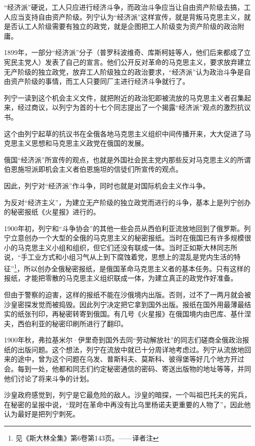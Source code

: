 “经济派”硬说，工人只应进行经济斗争，而政治斗争应当让自由资产阶级去搞，工人应当支持自由资产阶级。列宁认为“经济派”这样宣传，就是背叛马克思主义，就是否认工人阶级需要有独立的政党，就是企图把工人阶级变为资产阶级的政治附庸。

1899年，一部分“经济派”分子（普罗科波维奇、库斯柯娃等人，他们后来都成了立宪民主党人）发表了自己的宣言。他们公开反对革命的马克思主义，要求放弃建立无产阶级的独立政党，放弃工人阶级独立的政治要求，“经济派”认为政治斗争是自由资产阶级的事情，而工人只要同厂主进行经济斗争就行了。

列宁一读到这个机会主义文件，就把附近的政治犯即被流放的马克思主义者召集起来，经过商议，以列宁为首的十七个同志提出了一个揭露“经济派”观点的激烈抗议书。

这个由列宁起草的抗议书在全俄各地马克思主义组织中间传播开来，大大促进了马克思主义思想和马克思主义政党在俄国的发展。

俄国“经济派”所宣传的观点，也就是外国社会民主党内那些反对马克思主义的所谓伯恩施坦派即机会主义者伯恩施坦的信徒们所宣传的观点。

因此，列宁对“经济派”作斗争，同时也就是对国际机会主义作斗争。

为反对“经济主义”，为建立无产阶级的独立政党而进行的斗争，基本上是列宁创办的秘密报纸《火星报》进行的。

1900年初，列宁和“斗争协会”的其他一些会员从西伯利亚流放地回到了俄罗斯。列宁立意创办一个大型的全俄的马克思主义的秘密报纸。当时在俄国已有许多规模很小的马克思主义小组和组织，但它们还没有联成一体。当时正如斯大林同志所说，“手工业方式和小组习气从上到下腐蚀着党，思想上的混乱是党内生活的特征”\footnote{见《斯大林全集》第6卷第143页。——译者注}，所以创办全俄秘密报纸，是俄国革命马克思主义者的基本任务。只有这样的报纸，才能把零散的马克思主义组织联成一体，为建立真正的政党作好准备。

但由于警察的迫害，这样的报纸不能在沙俄境内出版。否则，过不了一两月就会被沙皇密探发觉而被捣毁。因此列宁决定把它拿到国外出版。报纸在国外用最薄最结实的纸张刊印，再秘密转寄到俄国。有几号《火星报》在俄国境内由巴库、基什涅夫，西伯利亚的秘密印刷所进行了翻印。

1900年秋，弗拉基米尔·伊里奇到国外去同“劳动解放社”的同志们磋商全俄政治报纸的出版问题。这个想法，列宁在流放中就已十分周详地考虑过。列宁从流放地回来的途中，曾为这个问题在乌发、普斯科夫、莫斯科、彼得堡等好几个地方开过会。每到一处，他都和同志们约定秘密通信的密码、寄送出版物的地址等等，并同他们讨论了将来斗争的计划。

沙皇政府感觉到，列宁是它最危险的敌人。沙皇的暗探，一个叫祖巴托夫的宪兵，在秘密的呈报中说，“现时在革命中再没有比乌里杨诺夫更重要的人物了”，因此他认为最好是把列宁刺死。

